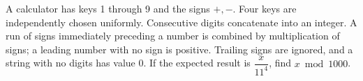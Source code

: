 A calculator has keys 1 through 9 and the signs $+,-$. Four keys are independently chosen uniformly. Consecutive digits concatenate into an integer. A run of signs immediately preceding a number is combined by multiplication of signs; a leading number with no sign is positive. Trailing signs are ignored, and a string with no digits has value 0. If the expected result is $\dfrac{x}{11^4}$, find $x\bmod1000$.
